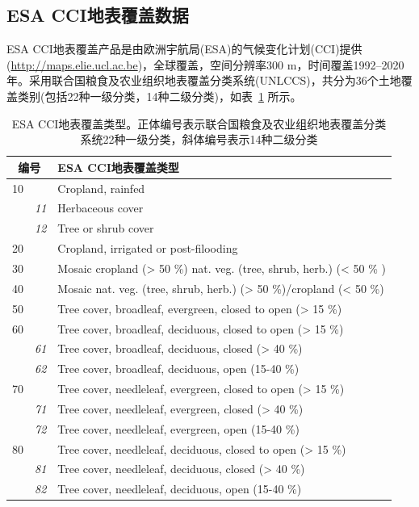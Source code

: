 \subsection{ESA CCI地表覆盖数据}\label{ESA地表覆盖数据}
ESA CCI地表覆盖产品是由欧洲宇航局(ESA)的气候变化计划(CCI)提供(\url{http://maps.elie.ucl.ac.be})，全球覆盖，空间分辨率300 m，时间覆盖1992--2020年。采用联合国粮食及农业组织地表覆盖分类系统(UNLCCS)，共分为36个土地覆盖类别(包括22种一级分类，14种二级分类)，如表~\ref{tab:ESA覆盖类型} 所示。

\begin{table}[htbp]
\centering
\caption[ESA CCI地表覆盖类型]{ESA CCI地表覆盖类型。正体编号表示联合国粮食及农业组织地表覆盖分类系统22种一级分类，斜体编号表示14种二级分类}
\label{tab:ESA覆盖类型}
\begin{tabular}{lll}
\toprule
\multicolumn{2}{c}{编号} & ESA CCI地表覆盖类型     \\ \midrule
10& & Cropland, rainfed\\
& \textit{11}& Herbaceous cover\\
& \textit{12}& Tree or shrub cover\\
20&& Cropland, irrigated or post-filooding\\
30&& Mosaic cropland (> 50 \%) nat. veg. (tree, shrub, herb.) (< 50 \% )\\
40&& Mosaic nat. veg. (tree, shrub, herb.) (> 50 \%)/cropland (< 50 \%) \\
50&& Tree cover, broadleaf, evergreen, closed to open (> 15 \%)          \\
60&& Tree cover, broadleaf, deciduous, closed to open (> 15 \%)        \\
& \textit{61}& Tree cover, broadleaf, deciduous, closed (> 40 \%)    \\
& \textit{62}& Tree cover, broadleaf, deciduous, open (15-40 \%)         \\
70&& Tree cover, needleleaf, evergreen, closed to open (> 15 \%)        \\
& \textit{71}& Tree cover, needleleaf, evergreen, closed (> 40 \%)        \\
& \textit{72}& Tree cover, needleleaf, evergreen, open (15-40 \%)       \\
80&& Tree cover, needleleaf, deciduous, closed to open (> 15 \%)        \\
& \textit{81}& Tree cover, needleleaf, deciduous, closed (> 40 \%)       \\
& \textit{82}& Tree cover, needleleaf, deciduous, open (15-40 \%)      \\ 

\end{tabular}
\end{table}
